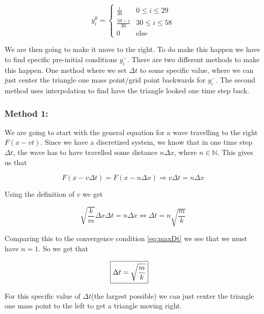 \documentclass[a4paper,norsk, 10pt]{article}
\begin{document}
\begin{equation}
y_i^0 =
\begin{cases}
\frac{i}{30} & 0 \leq i \leq 29\\
\frac{59-i}{30} & 30 \leq i \leq 58\\
0 & \text{else}
\end{cases}
\end{equation}

We are then going to make it move to the right. To do make this happen we have to find specific pre-initial conditions $y_i^-$. There are two different methods to make this happen. One method where we set $\Delta t$ to some specific value, where we can just center the triangle one mass point/grid point backwards for $y_i^-$. The second method uses interpolation to find have the triangle looked one time step back.

\subsubsection*{Method 1:}

We are going to start with the general equation for a wave travelling to the right $F(x - vt)$. Since we have a discretized system, we know that in one time step $\Delta t$, the wave has to have travelled some distance $n\Delta x$, where $n \in \mathbb{N}$. This gives us that

\begin{equation}
F(x - v\Delta t) = F(x - n\Delta x) \Rightarrow v\Delta t = n\Delta x
\end{equation}

Using the definition of $v$ we get

\begin{equation}
\sqrt{\frac{k}{m}}\Delta x \Delta t = n\Delta x \Leftrightarrow \Delta t = n\sqrt{\frac{m}{k}}
\label{eq:initialTriangle}
\end{equation}

Comparing this to the convergence condition \eqref{eq:maxDt} we see that we must have $n = 1$. So we get that

\begin{align}
\Aboxed{
\Delta t = \sqrt{\frac{m}{k}}
}
\end{align}

For this specific value of $\Delta t$(the largest possible) we can just center the triangle one mass point to the left to get a triangle moving right.
\end{document}
